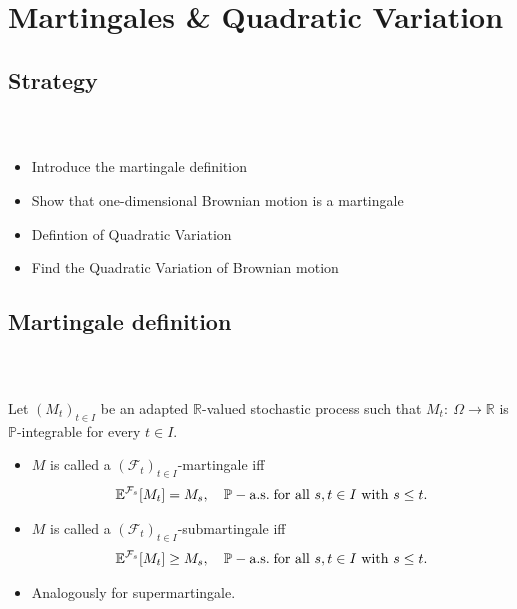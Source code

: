 \documentclass{beamer}
\numberwithin{equation}{section}
\newcommand{\task}[1]{
    \begin{center}
        \colorbox{red}{
            \textsf{
                \textbf{#1}
            }
        }
    \end{center}
}
\newenvironment{frame2}{\begin{frame}\frametitle{{\normalsize \secname} \\ {\large \subsecname}}}{\end{frame}}
\begin{document}
\section{Martingales \& Quadratic Variation}

\subsection{Strategy}
\begin{frame2}
    \begin{itemize}
        \item Introduce the martingale definition
        \item Show that one-dimensional Brownian motion is a martingale
        \item Defintion of Quadratic Variation
        \item Find the Quadratic Variation of Brownian motion
    \end{itemize}
 \end{frame2}

\subsection{Martingale definition}


\begin{frame2}
    Let $(M_t)_{t\in I}$ be an adapted $\mathbb{R}$-valued stochastic process such that $M_t: \ \Omega \rightarrow \mathbb{R}$ is $\mathbb{P}$-integrable for every $t\in I$.
    \begin{itemize}
        \item<-1> $M$ is called a $(\mathcal{F}_t)_{t\in I}$-martingale iff
        \begin{align}
            \mathbb{E}^{\mathcal{F}_s}[M_t] = M_s, \quad \mathbb{P}-\text{a.s.\! for all } s,t \in I \text{ with } s\leq t.
        \end{align}
        \item<2-> $M$ is called a $(\mathcal{F}_t)_{t\in I}$-submartingale iff
        \begin{align}
            \mathbb{E}^{\mathcal{F}_s}[M_t] \geq M_s, \quad \mathbb{P}-\text{a.s.\! for all } s,t \in I \text{ with } s\leq t.
        \end{align}
        \item<3-> Analogously for supermartingale.
    \end{itemize}
\end{frame2}
\end{document}
